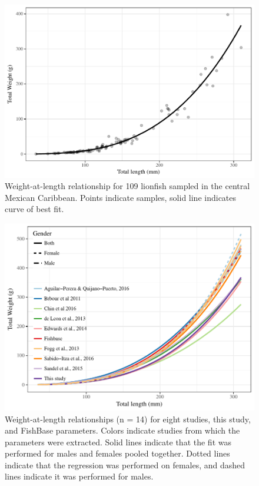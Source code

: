 \documentclass[12pt,]{article}
\begin{document}
\clearpage

\begin{figure}[htbp]
\centering
\includegraphics{Manuscript_files/figure-latex/unnamed-chunk-8-1.pdf}
\caption{Weight-at-length relationship for 109 lionfish sampled in the
central Mexican Caribbean. Points indicate samples, solid line indicates
curve of best fit.}
\end{figure}

\clearpage

\begin{figure}[htbp]
\centering
\includegraphics{Manuscript_files/figure-latex/unnamed-chunk-9-1.pdf}
\caption{Weight-at-length relationships (n = 14) for eight studies, this
study, and FishBase parameters. Colors indicate studies from which the
parameters were extracted. Solid lines indicate that the fit was
performed for males and females pooled together. Dotted lines indicate
that the regression was performed on females, and dashed lines indicate
it was performed for males.}
\end{figure}
\end{document}
